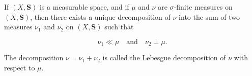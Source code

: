 If $(X, \mathbf{S})$ is a measurable space, and if $\mu$ and $\nu$ are $\sigma$-finite measures on $(X, \mathbf{S})$, then there exists a unique decomposition of $\nu$ into the sum of two measures $\nu_1$ and $\nu_2$ on $(X, \mathbf{S})$ such that

$$\nu_1 \ll \mu \quad \text{and} \quad \nu_2 \perp \mu.$$

The decomposition $\nu = \nu_1 + \nu_2$ is called the Lebesgue decomposition of $\nu$ with respect to $\mu$.

